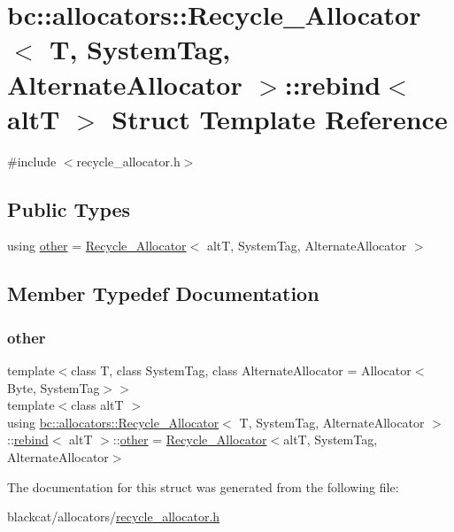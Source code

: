 \hypertarget{structbc_1_1allocators_1_1Recycle__Allocator_1_1rebind}{}\section{bc\+:\+:allocators\+:\+:Recycle\+\_\+\+Allocator$<$ T, System\+Tag, Alternate\+Allocator $>$\+:\+:rebind$<$ altT $>$ Struct Template Reference}
\label{structbc_1_1allocators_1_1Recycle__Allocator_1_1rebind}


{\ttfamily \#include $<$recycle\+\_\+allocator.\+h$>$}

\subsection*{Public Types}
\begin{DoxyCompactItemize}
\item 
using \hyperlink{structbc_1_1allocators_1_1Recycle__Allocator_1_1rebind_ad7fb9722a6ef3d18b183bcf88107b571}{other} = \hyperlink{structbc_1_1allocators_1_1Recycle__Allocator}{Recycle\+\_\+\+Allocator}$<$ altT, System\+Tag, Alternate\+Allocator $>$
\end{DoxyCompactItemize}


\subsection{Member Typedef Documentation}
\mbox{\label{structbc_1_1allocators_1_1Recycle__Allocator_1_1rebind_ad7fb9722a6ef3d18b183bcf88107b571}} 
\subsubsection{\texorpdfstring{other}{other}}
{\footnotesize\ttfamily template$<$class T, class System\+Tag, class Alternate\+Allocator = Allocator$<$\+Byte, System\+Tag$>$$>$ \\
template$<$class altT $>$ \\
using \hyperlink{structbc_1_1allocators_1_1Recycle__Allocator}{bc\+::allocators\+::\+Recycle\+\_\+\+Allocator}$<$ T, System\+Tag, Alternate\+Allocator $>$\+::\hyperlink{structbc_1_1allocators_1_1Recycle__Allocator_1_1rebind}{rebind}$<$ altT $>$\+::\hyperlink{structbc_1_1allocators_1_1Recycle__Allocator_1_1rebind_ad7fb9722a6ef3d18b183bcf88107b571}{other} =  \hyperlink{structbc_1_1allocators_1_1Recycle__Allocator}{Recycle\+\_\+\+Allocator}$<$altT, System\+Tag, Alternate\+Allocator$>$}



The documentation for this struct was generated from the following file\+:\begin{DoxyCompactItemize}
\item 
blackcat/allocators/\hyperlink{recycle__allocator_8h}{recycle\+\_\+allocator.\+h}\end{DoxyCompactItemize}
